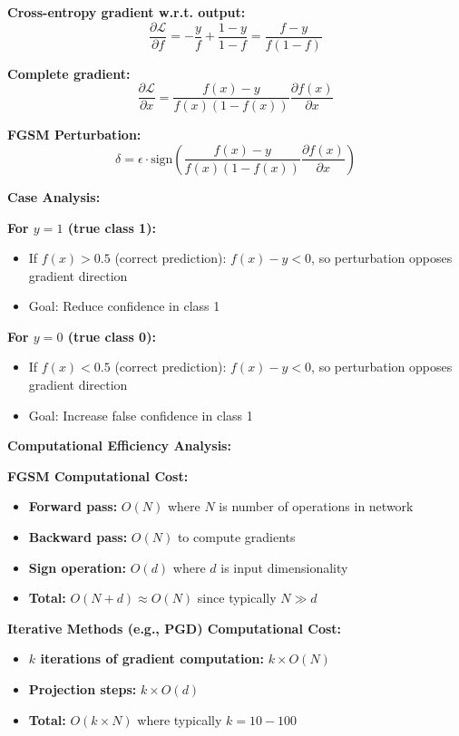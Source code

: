 \documentclass[12pt]{article}
\begin{document}
\begin{enumerate}[(a)]
{    \textbf{Cross-entropy gradient w.r.t. output:}
    $$\frac{\partial \mathcal{L}}{\partial f} = -\frac{y}{f} + \frac{1-y}{1-f} = \frac{f - y}{f(1-f)}$$
    
    \textbf{Complete gradient:}
    $$\frac{\partial \mathcal{L}}{\partial x} = \frac{f(x) - y}{f(x)(1-f(x))} \frac{\partial f(x)}{\partial x}$$
    
    \textbf{FGSM Perturbation:}
    $$\delta = \epsilon \cdot \text{sign}\left(\frac{f(x) - y}{f(x)(1-f(x))} \frac{\partial f(x)}{\partial x}\right)$$
    
    \textbf{Case Analysis:}
    
    \textbf{For $y = 1$ (true class 1):}
    \begin{itemize}
        \item If $f(x) > 0.5$ (correct prediction): $f(x) - y < 0$, so perturbation opposes gradient direction
        \item Goal: Reduce confidence in class 1
    \end{itemize}
    
    \textbf{For $y = 0$ (true class 0):}
    \begin{itemize}
        \item If $f(x) < 0.5$ (correct prediction): $f(x) - y < 0$, so perturbation opposes gradient direction  
        \item Goal: Increase false confidence in class 1
    \end{itemize}
    
    \textbf{Computational Efficiency Analysis:}
    
    \textbf{FGSM Computational Cost:}
    \begin{itemize}
        \item \textbf{Forward pass:} $O(N)$ where $N$ is number of operations in network
        \item \textbf{Backward pass:} $O(N)$ to compute gradients
        \item \textbf{Sign operation:} $O(d)$ where $d$ is input dimensionality
        \item \textbf{Total:} $O(N + d) \approx O(N)$ since typically $N \gg d$
    \end{itemize}
    
    \textbf{Iterative Methods (e.g., PGD) Computational Cost:}
    \begin{itemize}
        \item \textbf{$k$ iterations of gradient computation:} $k \times O(N)$
        \item \textbf{Projection steps:} $k \times O(d)$  
        \item \textbf{Total:} $O(k \times N)$ where typically $k = 10-100$
    \end{itemize}
    
}
\end{enumerate}
\end{document}
